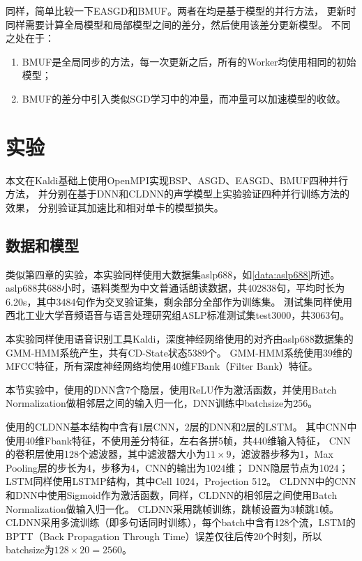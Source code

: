 同样，简单比较一下EASGD和BMUF。两者在均是基于模型的并行方法，
更新时同样需要计算全局模型和局部模型之间的差分，然后使用该差分更新模型。
不同之处在于：
\begin{enumerate}
\item BMUF是全局同步的方法，每一次更新之后，所有的Worker均使用相同的初始模型；
\item BMUF的差分中引入类似SGD学习中的冲量，而冲量可以加速模型的收敛。
\end{enumerate} 

\section{实验}

本文在Kaldi基础上使用OpenMPI实现BSP、ASGD、EASGD、BMUF四种并行方法，
并分别在基于DNN和CLDNN的声学模型上实验验证四种并行训练方法的效果，
分别验证其加速比和相对单卡的模型损失。

\subsection{数据和模型}

类似第四章的实验，本实验同样使用大数据集aslp688，如\ref{data:aslp688}所述。
aslp688共688小时，语料类型为中文普通话朗读数据，共402838句，平均时长为6.20s，其中3484句作为交叉验证集，剩余部分全部作为训练集。
测试集同样使用西北工业大学音频语音与语言处理研究组ASLP标准测试集test3000，共3063句。

本实验同样使用语音识别工具Kaldi，深度神经网络使用的对齐由aslp688数据集的GMM-HMM系统产生，共有CD-State状态5389个。
GMM-HMM系统使用39维的MFCC特征，所有深度神经网络均使用40维FBank（Filter Bank）特征。

本节实验中，使用的DNN含7个隐层，使用ReLU作为激活函数，并使用Batch Normalization做相邻层之间的输入归一化，DNN训练中batchsize为256。

使用的CLDNN基本结构中含有1层CNN，2层的DNN和2层的LSTM。
其中CNN中使用40维Fbank特征，不使用差分特征，左右各拼5帧，共440维输入特征，
CNN的卷积层使用128个滤波器，其中滤波器大小为$11×9$，滤波器步移为1，Max Pooling层的步长为4，步移为4，CNN的输出为1024维；
DNN隐层节点为1024；LSTM同样使用LSTMP结构，其中Cell 1024，Projection 512。
CLDNN中的CNN和DNN中使用Sigmoid作为激活函数，同样，CLDNN的相邻层之间使用Batch Normalization做输入归一化。
CLDNN采用跳帧训练，跳帧设置为3帧跳1帧。
CLDNN采用多流训练（即多句话同时训练），每个batch中含有128个流，LSTM的BPTT（Back Propagation Through Time）误差仅往后传20个时刻，所以
batchsize为$128×20 = 2560$。

